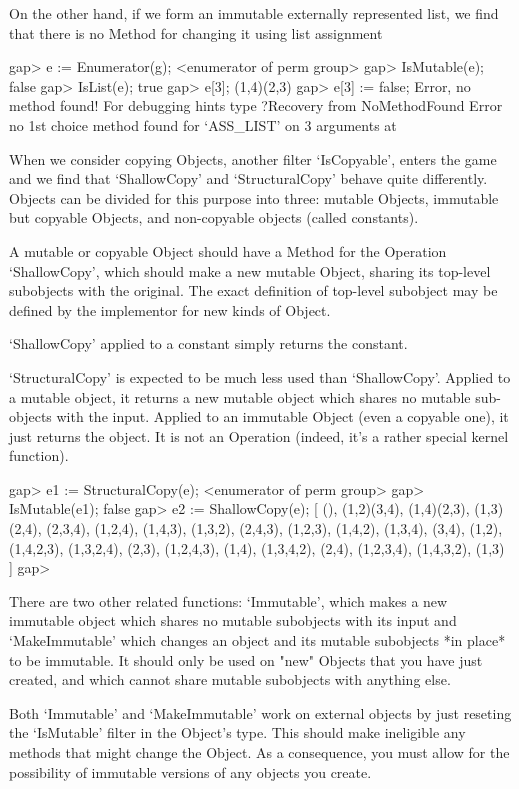 On the other hand, if we form an immutable externally represented list, we
find that there is no Method for changing it using list assignment

\beginexample
gap> e := Enumerator(g);
<enumerator of perm group>
gap> IsMutable(e);
false
gap> IsList(e);
true
gap> e[3];
(1,4)(2,3)
gap> e[3] := false;
Error, no method found! For debugging hints type ?Recovery from NoMethodFound
Error no 1st choice method found for `ASS_LIST' on 3 arguments at
\endexample

When we consider copying Objects, another filter `IsCopyable', enters
the game and we find that `ShallowCopy' and `StructuralCopy' behave quite
differently. Objects can be divided for this purpose into three:
mutable Objects, immutable but copyable Objects, and non-copyable
objects (called constants).

A mutable or copyable  Object should have a Method for the Operation
`ShallowCopy', which should make a new mutable Object, sharing its top-level
subobjects with the original. The exact definition of top-level subobject may
be defined by the implementor for new kinds of Object.

`ShallowCopy' applied to a constant simply returns the constant.

`StructuralCopy' is expected to be much less used than
`ShallowCopy'. Applied to a mutable object, it returns a new mutable
object which shares no mutable sub-objects with the input. Applied to
an immutable Object (even a copyable one), it just returns the
object. It is not an Operation (indeed, it's a rather special kernel
function).

\beginexample
gap> e1 := StructuralCopy(e);
<enumerator of perm group>
gap> IsMutable(e1);
false
gap> e2 := ShallowCopy(e);
[ (), (1,2)(3,4), (1,4)(2,3), (1,3)(2,4), (2,3,4), (1,2,4), (1,4,3), (1,3,2), 
  (2,4,3), (1,2,3), (1,4,2), (1,3,4), (3,4), (1,2), (1,4,2,3), (1,3,2,4), 
  (2,3), (1,2,4,3), (1,4), (1,3,4,2), (2,4), (1,2,3,4), (1,4,3,2), (1,3) ]
gap> 
\endexample

There are two other related functions: `Immutable', which makes a new
immutable object which shares no mutable subobjects with its input and
`MakeImmutable' which changes an object and its mutable subobjects *in
place* to be immutable. It should only be used on "new" Objects that
you have just created, and which cannot share mutable subobjects with
anything else.

Both `Immutable' and `MakeImmutable' work on external objects by just
reseting the `IsMutable' filter in the Object's type. This should make
ineligible any methods that might change the Object. As a consequence,
you must allow for the possibility of immutable versions of any
objects you create.

